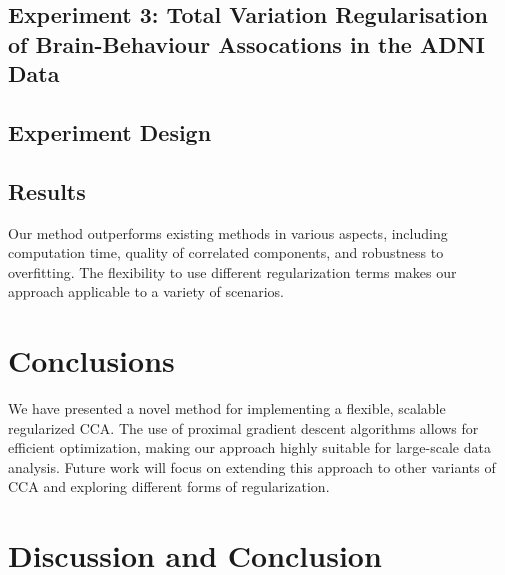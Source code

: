 \subsection{Experiment 3: Total Variation Regularisation of Brain-Behaviour Assocations in the ADNI Data}
\subsection{Experiment Design}

\subsection{Results}
Our method outperforms existing methods in various aspects, including computation time, quality of correlated components, and robustness to overfitting.
The flexibility to use different regularization terms makes our approach applicable to a variety of scenarios.

\section{Conclusions}
We have presented a novel method for implementing a flexible, scalable regularized CCA. The use of proximal gradient descent algorithms allows for efficient optimization, making our approach highly suitable for large-scale data analysis.
Future work will focus on extending this approach to other variants of CCA and exploring different forms of regularization.

\section{Discussion and Conclusion}


